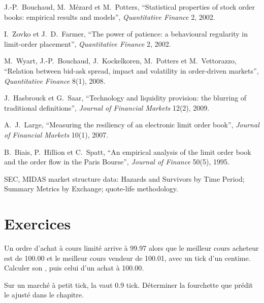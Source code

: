 \begin{omsources}
\item J.-P.~Bouchaud, M.~Mézard et M.~Potters, ``Statistical properties of stock order books: empirical results and models'', \emph{Quantitative
Finance} 2, 2002.
\item I.~Zovko et J.~D.~Farmer, ``The power of patience: a behavioural regularity in limit-order placement'', \emph{Quantitative Finance} 2, 2002.
\item M.~Wyart, J.-P.~Bouchaud, J.~Kockelkoren, M.~Potters et M.~Vettorazzo, ``Relation between bid-ask spread, impact and volatility in order-driven
markets'', \emph{Quantitative Finance} 8(1), 2008.
\item J.~Hasbrouck et G.~Saar, ``Technology and liquidity provision: the blurring of traditional definitions'', \emph{Journal of Financial Markets}
12(2), 2009.
\item A.~J.~Large, ``Measuring the resiliency of an electronic limit order book'', \emph{Journal of Financial Markets} 10(1), 2007.
\item B.~Biais, P.~Hillion et C.~Spatt, ``An empirical analysis of the limit order book and the order flow in the Paris Bourse'', \emph{Journal of
Finance} 50(5), 1995.
\item SEC, MIDAS market structure data: Hazards and Survivors by Time Period; Summary Metrics by Exchange; quote-life methodology.
\end{omsources}

\section{Exercices}

\begin{exercise}[$\star$]\label{exo:mx:empirical-facts-of-order-books:1}
Un ordre d'achat à cours limité arrive à 99.97 alors que le meilleur cours acheteur est de 100.00 et le meilleur cours vendeur de 100.01, avec un tick d'un centime. Calculer son , puis celui d'un achat
à 100.00.
\end{exercise}

\begin{exercise}[$\star$]\label{exo:mx:empirical-facts-of-order-books:2}
Sur un marché à petit tick, la  vaut 0.9 tick. Déterminer la fourchette que prédit le  ajusté dans le chapitre.
\end{exercise}

